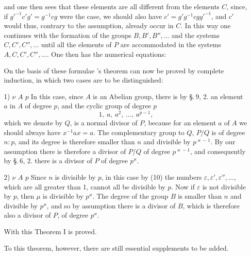 and one then sees that these elements are all different from the elements $C$, since, if $g'^{-1}c'g' = g^{-1}cg$ were the case, we should also have $c' = g'g^{-1}cgg'^{-1}$, and $c'$ would thus, contrary to the assumption, already occur in $C$. In this way one continues with the formation of the groups $B, B', B'', \ldots$ and the systems $C, C', C'', \ldots$ until all the elements of $P$ are accommodated in the systems $A, C, C', C'', \ldots$. One then has the numerical equations:

On the basis of these formulae 's theorem can now be proved by complete induction, in which two cases are to be distinguished:

1)  $\nu$  $A$  $p$ In this case, since $A$ is an Abelian group, there is by \S.\,9, 2. an element $a$ in $A$ of degree $p$, and the cyclic group of degree $p$
\[ 1,\ a,\ a^2,\ \ldots,\ a^{p-1}, \]
which we denote by $Q$, is a normal divisor of $P$, because for an element $a$ of $A$ we should always have $x^{-1}ax = a$. The complementary group to $Q$, $P/Q$ is of degree $n:p$, and its degree is therefore smaller than $n$ and divisible by $p^{\varkappa-1}$. By our assumption there is therefore a divisor of $P/Q$ of degree $p^{\varkappa-1}$, and consequently by \S.\,6, 2. there is a divisor of $P$ of degree $p^{\varkappa}$.

2)  $\nu$  $A$  $p$ Since $n$ is divisible by $p$, in this case by (10) the numbers $\varepsilon, \varepsilon', \varepsilon'', \ldots$, which are all greater than 1, cannot all be divisible by $p$. Now if $\varepsilon$ is not divisible by $p$, then $\mu$ is divisible by $p^{\varkappa}$. The degree of the group $B$ is smaller than $n$ and divisible by $p^{\varkappa}$, and so by assumption there is a divisor of $B$, which is therefore also a divisor of $P$, of degree $p^{\varkappa}$.

With this Theorem I is proved.

To this theorem, however, there are still essential supplements to be added.
